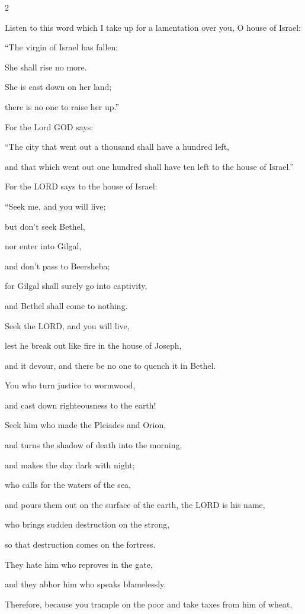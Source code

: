 \begin{multicols}{2}
	
	\mychapter{} \myverse*{}Listen to this word which I take up for a lamentation over you,
	O house of Israel:
	
	\myverse{}“The virgin of Israel has fallen;
	
	She shall rise no more.
	
	She is cast down on her land;
	
	there is no one to raise her up.”
	
	\myverse{}For the Lord GOD says:
	
	“The city that went out a thousand shall have a hundred left,
	
	and that which went out one hundred shall have ten left to the house of Israel.”
	
	\myverse{}For the LORD says to the house of Israel:
	
	“Seek me, and you will live;
	
	\myverse{}but don’t seek Bethel,
	
	nor enter into Gilgal,
	
	and don’t pass to Beersheba;
	
	for Gilgal shall surely go into captivity,
	
	and Bethel shall come to nothing.
	
	\myverse{}Seek the LORD, and you will live,
	
	lest he break out like fire in the house of Joseph,
	
	and it devour, and there be no one to quench it in Bethel.
	
	\myverse{}You who turn justice to wormwood,
	
	and cast down righteousness to the earth!
	
	\myverse{}Seek him who made the Pleiades and Orion,
	
	and turns the shadow of death into the morning,
	
	and makes the day dark with night;
	
	who calls for the waters of the sea,
	
	and pours them out on the surface of the earth, the LORD is his name,
	
	\myverse{}who brings sudden destruction on the strong,
	
	so that destruction comes on the fortress.
	
	\myverse{}They hate him who reproves in the gate,
	
	and they abhor him who speaks blamelessly.
	
	\myverse{}Therefore, because you trample on the poor and take taxes from
	him of wheat,
	

\end{multicols}
